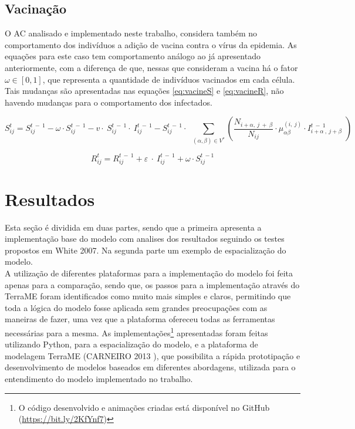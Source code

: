 \documentclass[a4paper,12pt]{article}
\begin{document}
\newpage
\subsection{Vacinação}
O AC analisado e implementado neste trabalho, considera também no comportamento dos indivíduos a adição de vacina contra o vírus da epidemia. As equações para este caso tem comportamento análogo ao já apresentado anteriormente, com a diferença de que, nessas que consideram a vacina há o fator $\omega \in [0, 1]$, que representa a quantidade de indivíduos vacinados em cada célula. Tais mudanças são apresentadas nas equações \ref{eq:vacineS} e \ref{eq:vacineR}, não havendo mudanças para o comportamento dos infectados.

\begin{equation} 
S_{ij}^t=S_{ij}^{t\:-\:1}-\omega \cdot S_{ij}^{t\:-\:1}-v\cdot \:S_{ij}^{t\:-\:1}\cdot \:I_{ij}^{t\:-\:1}-S_{ij}^{t\:-\:1}\cdot \:\displaystyle \:\sum _{\left(\alpha ,\beta \right)\in V^{\ast }}^{ }\left(\frac{N_{i+\alpha ,\:j\:+\:\beta }}{N_{ij}}\cdot \mu _{\alpha \beta }^{\left(i,\:j\right)}\cdot I_{i+\alpha \:,\:j+\beta \:}^{t\:-\:1}\:\right)
\label{eq:vacineS}
\end{equation}

\begin{equation} 
R_{ij}^t=R_{ij}^{t\:-\:1}+\varepsilon \:\cdot \:I_{ij}^{t\:-\:1}+\omega \cdot S_{ij}^{t\:-1}
\label{eq:vacineR}
\end{equation}

\section{Resultados}

Esta seção é dividida em duas partes, sendo que a primeira apresenta a implementação base do modelo com analises dos resultados seguindo os testes propostos em White 2007\cite{White2007}. Na segunda parte um exemplo de espacialização do modelo.\\

A utilização de diferentes plataformas para a implementação do modelo foi feita apenas para a comparação, sendo que, os passos para a implementação através do TerraME foram identificados como muito mais simples e claros, permitindo que toda a lógica do modelo fosse aplicada sem grandes preocupações com as maneiras de fazer, uma vez que a plataforma ofereceu todas as ferramentas necessárias para a mesma. As implementações\footnote{O código desenvolvido e animações criadas está disponível no GitHub (\href{https://github.com/M3nin0/epidemic-model}{https://bit.ly/2KfYnf7})} apresentadas foram feitas utilizando Python, para a espacialização do modelo, e a plataforma de modelagem TerraME (CARNEIRO 2013 \cite{CARNEIRO2013104}), que possibilita a rápida prototipação e desenvolvimento de modelos baseados em diferentes abordagens, utilizada para o entendimento do modelo implementado no trabalho.
\end{document}
